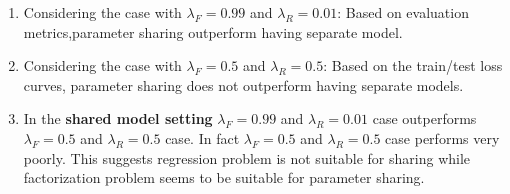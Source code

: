 \documentclass[12pt]{article}
\begin{document}
\begin{enumerate}
    \item Considering the case with $\lambda_F=0.99$ and $\lambda_R=0.01$: Based on evaluation metrics,parameter sharing outperform having separate model.

    \item Considering the case with $\lambda_F=0.5$ and $\lambda_R=0.5$:  Based on the train/test loss curves, parameter sharing does not outperform having separate models.

    \item In the \textbf{shared model setting} $\lambda_F=0.99$ and $\lambda_R=0.01$ case outperforms $\lambda_F=0.5$ and $\lambda_R=0.5$ case. In fact $\lambda_F=0.5$ and $\lambda_R=0.5$ case performs very poorly. This suggests regression problem is not suitable for sharing while factorization problem seems to be suitable for parameter sharing.

\end{enumerate}

\newpage


\end{document}

